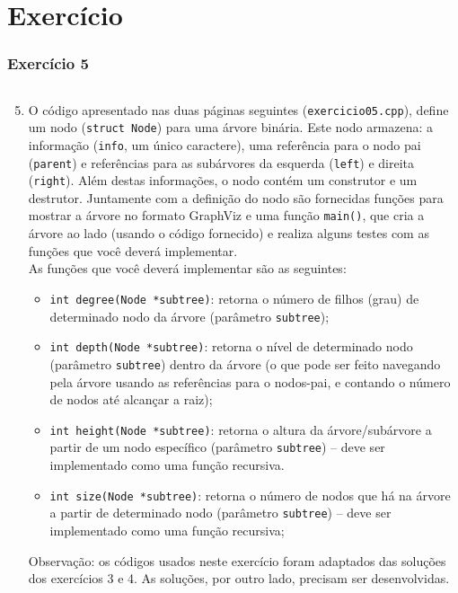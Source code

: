 \documentclass[aspectratio=169]{beamer}
\begin{document}
\section{Exercício}

\begin{frame}[fragile]\frametitle{Exercício 5}
\begin{columns}[T]
\begin{column}{0.75\linewidth}
\begin{enumerate}
        \setcounter{enumi}{4}
	\scriptsize
	\item O código apresentado nas duas páginas seguintes (\texttt{exercicio05.cpp}), define um nodo (\texttt{struct Node}) para uma árvore binária. Este nodo armazena: a informação (\texttt{info}, um único caractere), uma referência para o nodo pai (\texttt{parent}) e referências para as subárvores da esquerda (\texttt{left}) e direita (\texttt{right}). Além destas informações, o nodo contém um construtor e um destrutor. Juntamente com a definição do nodo são fornecidas funções para mostrar a árvore no formato GraphViz e uma função \texttt{main()}, que cria a árvore ao lado (usando o código fornecido) e realiza alguns testes com as funções que você deverá implementar.\\
	As funções que você deverá implementar são as seguintes:
	\begin{itemize}
		\tiny
		\item \texttt{int degree(Node *subtree)}: retorna o número de filhos (grau) de determinado nodo da árvore (parâmetro \texttt{subtree});
		\item \texttt{int depth(Node *subtree)}: retorna o nível de determinado nodo (parâmetro \texttt{subtree}) dentro da árvore (o que pode ser feito navegando pela árvore usando as referências para o nodos-pai, e contando o número de nodos até alcançar a raiz);
		\item \texttt{int height(Node *subtree)}: retorna o altura da árvore/subárvore a partir de um nodo específico (parâmetro \texttt{subtree}) -- deve ser implementado como uma função recursiva.
		\item \texttt{int size(Node *subtree)}: retorna o número de nodos que há na árvore a partir de determinado nodo (parâmetro \texttt{subtree}) -- deve ser implementado como uma função recursiva;
	\end{itemize}
Observação: os códigos usados neste exercício foram adaptados das soluções dos exercícios 3 e 4. As soluções, por outro lado, precisam ser desenvolvidas.

\end{enumerate}
\end{column}
\end{columns}
\end{frame}
\end{document}
